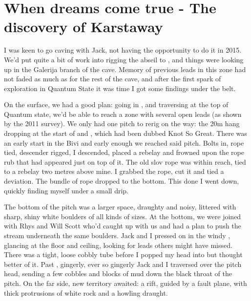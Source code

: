 \section{When dreams come true - The discovery of Karstaway} 


I was keen to go caving with Jack, not having the opportunity to do it in 2015. We'd put quite a bit of work into rigging the abseil to , and things were looking up in the Galerija branch of the cave. Memory of previous leads in this zone had not faded as much as for the rest of the cave, and after the first spark of exploration in Quantum State it was time I got some findings under the belt.

On the surface, we had a good plan: going in , and traversing at the top of Quantum state, we'd be able to reach a zone with several open leads (as shown by the 2011 survey). We only had one pitch to rerig on the way: the 20m hang dropping at the start of  and , which had been dubbed Knot So Great. There was an early start in the Bivi and early enough we reached said pitch. Bolts in, rope tied, descender rigged, I descended, placed a rebelay and frowned upon the rope rub that had appeared just on top of it. The old slov rope was within reach, tied to a rebelay two metres above mine. I grabbed the rope, cut it and tied a deviation. The bundle of rope dropped to the bottom. This done I went down, quickly finding myself under a small drip. 

The bottom of the pitch was a larger space, draughty and noisy, littered with sharp, shiny white boulders of all kinds of sizes. At the bottom, we were joined with Rhys and Will Scott who'd caught up with us and had a plan to push the stream underneath the same boulders. Jack and I pressed on in the windy , glancing at the floor and ceiling, looking for leads others might have missed. There was a tight, loose cobbly tube before  I popped my head into but thought better of it. Past , gingerly, ever so gingerly Jack and I traversed over the pitch head, sending a few cobbles and blocks of mud down the black throat of the pitch. On the far side, new territory awaited: a rift, guided by a fault plane, with thick protrusions of white rock and a howling draught.

